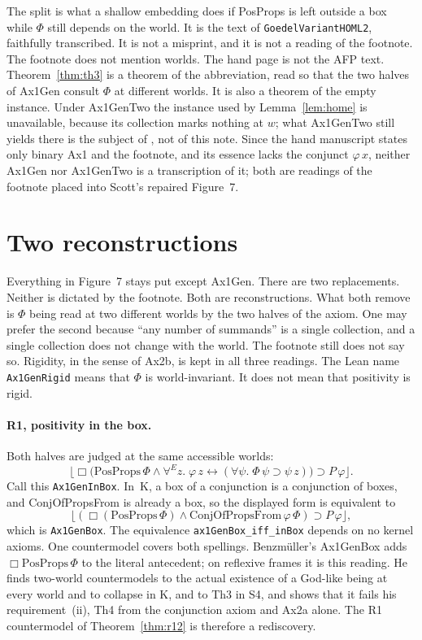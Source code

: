 \documentclass[11pt,a4paper]{article}
\newcommand{\valid}[1]{\lfloor #1 \rfloor}
\newcommand{\Nec}{\Box}
\newcommand{\allE}{\forall^{E}}
\newcommand{\lean}[1]{\texttt{#1}}
\theoremstyle{definition}
\theoremstyle{remark}
\begin{document}
The split is what a shallow embedding does if PosProps is left outside a box
while \(\Phi\) still depends on the world.
It is the text of \lean{GoedelVariantHOML2}, faithfully transcribed.
It is not a misprint, and it is not a reading of the footnote.
The footnote does not mention worlds.
The hand page is not the AFP text.
Theorem~\ref{thm:th3} is a theorem of the abbreviation, read so that the two
halves of Ax1Gen consult \(\Phi\) at different worlds.
It is also a theorem of the empty instance.
Under Ax1GenTwo the instance used by Lemma~\ref{lem:home} is unavailable,
because its collection marks nothing at \(w\); what Ax1GenTwo still yields there is the
subject of \cite[Sect.~6]{benzmuellerPWN2026}, not of this note.
Since the hand manuscript states only binary Ax1 and the footnote, and its
essence lacks the conjunct \(\varphi\,x\), neither Ax1Gen nor Ax1GenTwo is a
transcription of it; both are readings of the footnote placed into Scott's
repaired Figure~7.

\section{Two reconstructions}
\label{sec:recon}

Everything in Figure~7 stays put except Ax1Gen.
There are two replacements.
Neither is dictated by the footnote.
Both are reconstructions.
What both remove is \(\Phi\) being read at two different worlds by the two
halves of the axiom.
One may prefer the second because ``any number of summands'' is a single
collection, and a single collection does not change with the world.
The footnote still does not say so.
Rigidity, in the sense of Ax2b, is kept in all three readings.
The Lean name \lean{Ax1GenRigid} means that \(\Phi\) is world-invariant.
It does not mean that positivity is rigid.

\paragraph{R1, positivity in the box.}
Both halves are judged at the same accessible worlds:
\[
  \valid{\Nec\bigl(\mathrm{PosProps}\,\Phi \land
    \allE z.\; \varphi\,z \leftrightarrow
    (\forall \psi.\; \Phi\,\psi \supset \psi\,z)\bigr)
    \supset P\,\varphi}.
\]
Call this \lean{Ax1GenInBox}.
In~K, a box of a conjunction is a conjunction of boxes, and
ConjOfPropsFrom is already a box, so the displayed form is equivalent to
\[
  \valid{(\Nec(\mathrm{PosProps}\,\Phi) \land
    \mathrm{ConjOfPropsFrom}\,\varphi\,\Phi) \supset P\,\varphi},
\]
which is \lean{Ax1GenBox}.
The equivalence \lean{ax1GenBox\_iff\_inBox} depends on no kernel axioms.
One countermodel covers both spellings.
Benzm\"uller's Ax1GenBox \cite[Sect.~6.3; v3 Sect.~6.4.2]{benzmuellerPWN2026} adds
\(\Nec\mathrm{PosProps}\,\Phi\) to the literal antecedent; on reflexive frames
it is this reading.
He finds two-world countermodels to the actual existence of a God-like
being at every world and to collapse in K, and to Th3 in S4, and shows that it fails his requirement~(ii), Th4 from the
conjunction axiom and Ax2a alone.
The R1 countermodel of Theorem~\ref{thm:r12} is therefore a rediscovery.
\end{document}
